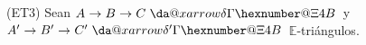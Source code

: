 \documentclass[preview]{standalone}
\makeatletter
\newcommand*{\da@xarrow}[7]{%
                                 \sbox0{$\ifx#7\scriptstyle\scriptscriptstyle\else\scriptstyle\fi#5#1#6\m@th$}%
                                 \sbox2{$\ifx#7\scriptstyle\scriptscriptstyle\else\scriptstyle\fi#5#2#6\m@th$}%
                                 \sbox4{$#7\dabar@\m@th$}%
                                 \dimen@=\wd0 %
                                 \ifdim\wd2 >\dimen@
                                   \dimen@=\wd2 %
                                 \fi
                                 \count@=2 %
                                 \def\da@bars{\dabar@\dabar@}%
                                 \@whiledim\count@\wd4<\dimen@\do{%
                                   \advance\count@\@ne
                                   \expandafter\def\expandafter\da@bars\expandafter{%
                                     \da@bars
                                     \dabar@ 
                                   }%
                                 }%
                                 \mathrel{#3}%
                                 \mathrel{%
                                   \mathop{\da@bars}\limits
                                   \ifx\\#1\\%
                                   \else
                                     _{\copy0}%
                                   \fi
                                   \ifx\\#2\\%
                                   \else
                                     ^{\copy2}%
                                   \fi
                                 }%
                                 \mathrel{#4}%
                               }
\newcommand*{\da@rightarrow}{\mathchar"0\hexnumber@\symAMSa 4B }
\newcommand*{\xdashrightarrow}[2][]{%
                                 \mathrel{%
                                   \mathpalette{\da@xarrow{#1}{#2}{}\da@rightarrow{\,}{}}{}%
                                 }%
                               }
\makeatother
\begin{document}
\begin{center}
(ET3) Sean $A \hspace{0.1mm} \to \hspace{0.1mm}  B \hspace{0.1mm} \to \hspace{0.1mm}  C \hspace{0.1mm} \xdashrightarrow{\delta}$ \hspace{1.25mm} y \hspace{1.25mm} $A' \hspace{0.1mm}\to \hspace{0.1mm} B' \hspace{0.1mm}\to \hspace{0.1mm} C' \hspace{0.1mm}\xdashrightarrow{\delta'}$ $\mathbb{E}$-triángulos. \hspace{3cm}
\end{center}
\end{document}
